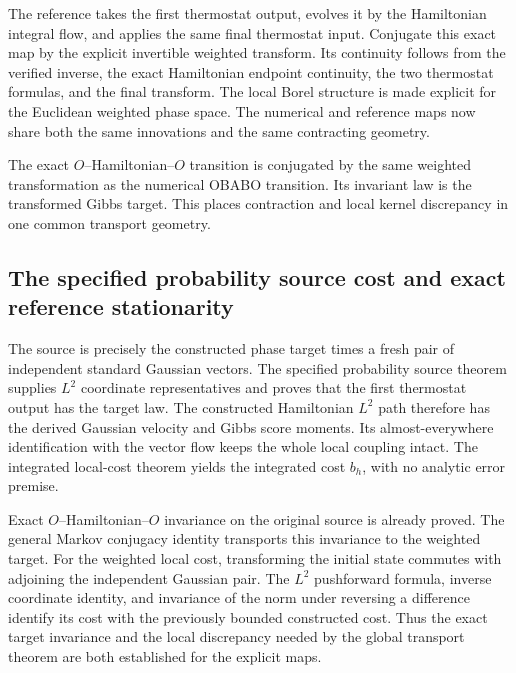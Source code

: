 \documentclass[11pt,a4paper]{report}
\begin{document}
The reference takes the first thermostat output, evolves it by the Hamiltonian integral flow, and applies the same final thermostat input. Conjugate this exact map by the explicit invertible weighted transform. Its continuity follows from the verified inverse, the exact Hamiltonian endpoint continuity, the two thermostat formulas, and the final transform. The local Borel structure is made explicit for the Euclidean weighted phase space. The numerical and reference maps now share both the same innovations and the same contracting geometry.



The exact \(O\)–Hamiltonian–\(O\) transition is conjugated by the same weighted transformation as the numerical OBABO transition. Its invariant law is the transformed Gibbs target. This places contraction and local kernel discrepancy in one common transport geometry.

\subsection{\texorpdfstring{The specified probability source cost and exact reference stationarity}{The specified probability source cost and exact reference stationarity}}
\label{report-step-KineticLangevin-OBABOBias-lean-2}


The source is precisely the constructed phase target times a fresh pair of independent standard Gaussian vectors. The specified probability source theorem supplies \(L^{2}\) coordinate representatives and proves that the first thermostat output has the target law. The constructed Hamiltonian \(L^{2}\) path therefore has the derived Gaussian velocity and Gibbs score moments. Its almost-everywhere identification with the vector flow keeps the whole local coupling intact. The integrated local-cost theorem yields the integrated cost \(b_h\), with no analytic error premise.



Exact \(O\)–Hamiltonian–\(O\) invariance on the original source is already proved. The general Markov conjugacy identity transports this invariance to the weighted target. For the weighted local cost, transforming the initial state commutes with adjoining the independent Gaussian pair. The \(L^{2}\) pushforward formula, inverse coordinate identity, and invariance of the norm under reversing a difference identify its cost with the previously bounded constructed cost. Thus the exact target invariance and the local discrepancy needed by the global transport theorem are both established for the explicit maps.
\end{document}
